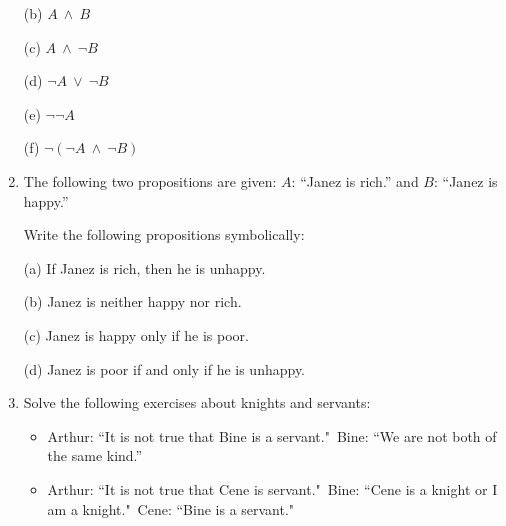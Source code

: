 \documentclass[11pt,paper=b5,footinclude,headinclude]{scrbook} %
\def\ali {{~\vee~}}
\def\inn {{~\wedge~}}
\begin{document}
\begin{enumerate}
(b) $A\inn B$

(c) $A\inn \neg B$

(d) $\neg A\ali \neg B$

(e) $\neg \neg A$

(f) $\neg (\neg A\inn \neg B)$

\medskip
\item
The following two propositions are given:
$A$: ``Janez is rich.'' and $B$: ``Janez is happy.''

Write the following propositions symbolically:

(a) If Janez is rich, then he is unhappy.

(b) Janez is neither happy nor rich.

(c) Janez is happy only if he is poor.

(d) Janez is poor if and only if he is unhappy.

\item Solve the following exercises about knights and servants:
\begin{itemize}
  \item Arthur: ``It is not true that Bine is a servant."~Bine: ``We are not both of the same kind.''
  \item Arthur: ``It is not true that Cene is servant."~Bine: ``Cene is a knight or I am a knight."~Cene: ``Bine is a servant."
\end{itemize}


\end{enumerate}
\end{document}
